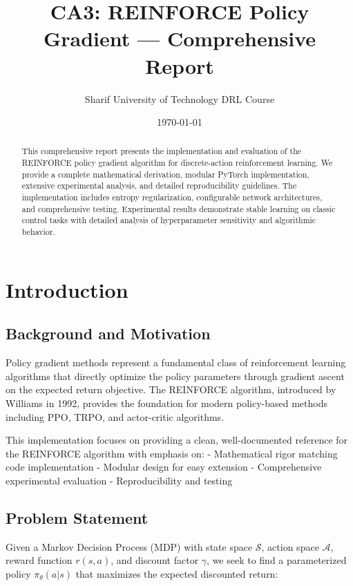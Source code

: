\documentclass{article}
\title{CA3: REINFORCE Policy Gradient — Comprehensive Report}
\author{Sharif University of Technology DRL Course}
\date{\today}
\begin{document}
\maketitle

\begin{abstract}
This comprehensive report presents the implementation and evaluation of the REINFORCE policy gradient algorithm for discrete-action reinforcement learning. We provide a complete mathematical derivation, modular PyTorch implementation, extensive experimental analysis, and detailed reproducibility guidelines. The implementation includes entropy regularization, configurable network architectures, and comprehensive testing. Experimental results demonstrate stable learning on classic control tasks with detailed analysis of hyperparameter sensitivity and algorithmic behavior.
\end{abstract}

\section{Introduction}

\subsection{Background and Motivation}

Policy gradient methods represent a fundamental class of reinforcement learning algorithms that directly optimize the policy parameters through gradient ascent on the expected return objective. The REINFORCE algorithm, introduced by Williams in 1992, provides the foundation for modern policy-based methods including PPO, TRPO, and actor-critic algorithms.

This implementation focuses on providing a clean, well-documented reference for the REINFORCE algorithm with emphasis on:
- Mathematical rigor matching code implementation
- Modular design for easy extension
- Comprehensive experimental evaluation
- Reproducibility and testing

\subsection{Problem Statement}

Given a Markov Decision Process (MDP) with state space $\mathcal{S}$, action space $\mathcal{A}$, reward function $r(s,a)$, and discount factor $\gamma$, we seek to find a parameterized policy $\pi_\theta(a|s)$ that maximizes the expected discounted return:
\end{document}
